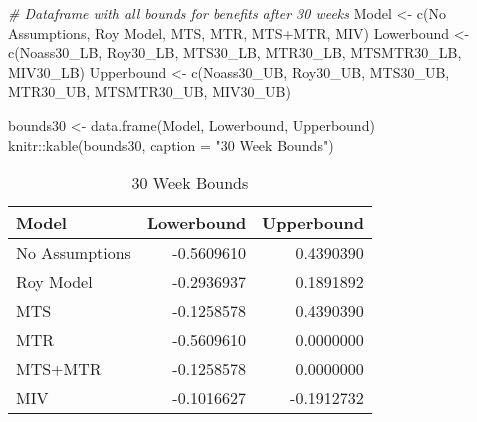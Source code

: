 \documentclass[
]{article}
\newenvironment{Shaded}{\begin{snugshade}}{\end{snugshade}}
\newcommand{\AttributeTok}[1]{\textcolor[rgb]{0.77,0.63,0.00}{#1}}
\newcommand{\CommentTok}[1]{\textcolor[rgb]{0.56,0.35,0.01}{\textit{#1}}}
\newcommand{\FunctionTok}[1]{\textcolor[rgb]{0.00,0.00,0.00}{#1}}
\newcommand{\NormalTok}[1]{#1}
\newcommand{\OtherTok}[1]{\textcolor[rgb]{0.56,0.35,0.01}{#1}}
\newcommand{\SpecialCharTok}[1]{\textcolor[rgb]{0.00,0.00,0.00}{#1}}
\newcommand{\StringTok}[1]{\textcolor[rgb]{0.31,0.60,0.02}{#1}}
\begin{document}
\begin{Shaded}
\begin{Highlighting}[]
\CommentTok{\# Dataframe with all bounds for benefits after 30 weeks}
\NormalTok{Model }\OtherTok{\textless{}{-}} \FunctionTok{c}\NormalTok{(}\StringTok{\textquotesingle{}No Assumptions\textquotesingle{}}\NormalTok{, }\StringTok{\textquotesingle{}Roy Model\textquotesingle{}}\NormalTok{, }\StringTok{\textquotesingle{}MTS\textquotesingle{}}\NormalTok{, }\StringTok{\textquotesingle{}MTR\textquotesingle{}}\NormalTok{, }\StringTok{\textquotesingle{}MTS+MTR\textquotesingle{}}\NormalTok{, }\StringTok{\textquotesingle{}MIV\textquotesingle{}}\NormalTok{)}
\NormalTok{Lowerbound }\OtherTok{\textless{}{-}} \FunctionTok{c}\NormalTok{(Noass30\_LB, Roy30\_LB, MTS30\_LB, MTR30\_LB, MTSMTR30\_LB, MIV30\_LB)}
\NormalTok{Upperbound }\OtherTok{\textless{}{-}} \FunctionTok{c}\NormalTok{(Noass30\_UB, Roy30\_UB, MTS30\_UB, MTR30\_UB, MTSMTR30\_UB, MIV30\_UB)}

\NormalTok{bounds30 }\OtherTok{\textless{}{-}} \FunctionTok{data.frame}\NormalTok{(Model, Lowerbound, Upperbound)}
\NormalTok{knitr}\SpecialCharTok{::}\FunctionTok{kable}\NormalTok{(bounds30, }\AttributeTok{caption =} \StringTok{"30 Week Bounds"}\NormalTok{)}
\end{Highlighting}
\end{Shaded}

\begin{table}

\caption{\label{tab:unnamed-chunk-8}30 Week Bounds}
\centering
\begin{tabular}[t]{l|r|r}
\hline
Model & Lowerbound & Upperbound\\
\hline
No Assumptions & -0.5609610 & 0.4390390\\
\hline
Roy Model & -0.2936937 & 0.1891892\\
\hline
MTS & -0.1258578 & 0.4390390\\
\hline
MTR & -0.5609610 & 0.0000000\\
\hline
MTS+MTR & -0.1258578 & 0.0000000\\
\hline
MIV & -0.1016627 & -0.1912732\\
\hline
\end{tabular}
\end{table}

\begin{Shaded}
\end{Shaded}
\end{document}

